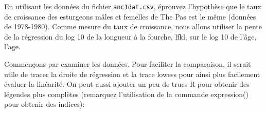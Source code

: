 \documentclass[
  12pt,
]{book}
\makeatletter
\newenvironment{Shaded}{\begin{snugshade}}{\end{snugshade}}
\newcommand{\DataTypeTok}[1]{\textcolor[rgb]{0.13,0.29,0.53}{#1}}
\newcommand{\DecValTok}[1]{\textcolor[rgb]{0.00,0.00,0.81}{#1}}
\newcommand{\KeywordTok}[1]{\textcolor[rgb]{0.13,0.29,0.53}{\textbf{#1}}}
\newcommand{\NormalTok}[1]{#1}
\newcommand{\OperatorTok}[1]{\textcolor[rgb]{0.81,0.36,0.00}{\textbf{#1}}}
\newcommand{\OtherTok}[1]{\textcolor[rgb]{0.56,0.35,0.01}{#1}}
\newcommand{\StringTok}[1]{\textcolor[rgb]{0.31,0.60,0.02}{#1}}
\newenvironment{kframe}{%
\medskip{}
\setlength{\fboxsep}{.8em}
\def\at@end@of@kframe{}%
\ifinner\ifhmode%
 \def\at@end@of@kframe{\end{minipage}}%
 \begin{minipage}{\columnwidth}%
\fi\fi%
\def\FrameCommand##1{\hskip\@totalleftmargin \hskip-\fboxsep
\colorbox{incolor}{##1}\hskip-\fboxsep
    \hskip-\linewidth \hskip-\@totalleftmargin \hskip\columnwidth}%
\MakeFramed {\advance\hsize-\width
  \@totalleftmargin\z@ \linewidth\hsize
  \@setminipage}}%
{\par\unskip\endMakeFramed%
\at@end@of@kframe}
\newenvironment{rmdblock}[1]
 {
 \begin{itemize}
 \renewcommand{\labelitemi}{
   \raisebox{-.7\height}[0pt][0pt]{
     {\setkeys{Gin}{width=3em,keepaspectratio}\texttt{[image: images/\#1]}}
   }
 }
 \begin{kframe}
 \setlength{\fboxsep}{1em}
 \item
 }
 {
 \end{kframe}
 \end{itemize}
 }
\newenvironment{rmdcode}
  {\begin{rmdblock}{screen}}
  {\end{rmdblock}}
\makeatother
\begin{document}
\begin{rmdcode}
En utilisant les données du fichier \texttt{anc1dat.csv}, éprouvez l'hypothèse que le taux de croissance des esturgeons mâles et femelles de The Pas est le même (données de 1978-1980). Comme mesure du taux de croissance, nous allons utiliser la pente de la régression du log 10 de la longueur à la fourche, lfkl, sur le log 10 de l'âge, l'age.
\end{rmdcode}

Commençons par examiner les données. Pour faciliter la comparaison, il serait utile de tracer la droite de régression et la trace lowess pour ainsi plus facilement évaluer la linéarité. On peut aussi ajouter un peu de trucs R pour obtenir des légendes plus complètes (remarquez l'utilisation de la commande expression() pour obtenir des indices):

\begin{Shaded}
\end{Shaded}
\end{document}
